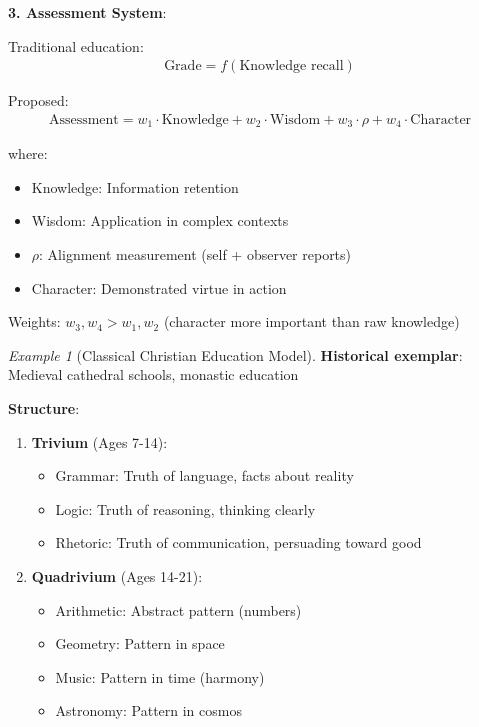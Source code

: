 \documentclass[11pt,a4paper]{article}
\theoremstyle{definition}
\theoremstyle{remark}
\newtheorem{example}{Example}[section]
\begin{document}
\begin{small}
\begin{enumerate}
\begin{protocol}
\begin{protocol}
\textbf{3. Assessment System}:

Traditional education:
\begin{align}
\text{Grade} = f(\text{Knowledge recall})
\end{align}

Proposed:
\begin{align}
\text{Assessment} = w_1 \cdot \text{Knowledge} + w_2 \cdot \text{Wisdom} + w_3 \cdot \rho + w_4 \cdot \text{Character}
\end{align}

where:
\begin{itemize}
    \item Knowledge: Information retention
    \item Wisdom: Application in complex contexts
    \item \(\rho\): Alignment measurement (self + observer reports)
    \item Character: Demonstrated virtue in action
\end{itemize}

Weights: \(w_3, w_4 > w_1, w_2\) (character more important than raw knowledge)
\end{protocol}

\begin{example}[Classical Christian Education Model]
\textbf{Historical exemplar}: Medieval cathedral schools, monastic education

\textbf{Structure}:
\begin{enumerate}
    \item \textbf{Trivium} (Ages 7-14):
        \begin{itemize}
            \item Grammar: Truth of language, facts about reality
            \item Logic: Truth of reasoning, thinking clearly
            \item Rhetoric: Truth of communication, persuading toward good
        \end{itemize}
    
    \item \textbf{Quadrivium} (Ages 14-21):
        \begin{itemize}
            \item Arithmetic: Abstract pattern (numbers)
            \item Geometry: Pattern in space
            \item Music: Pattern in time (harmony)
            \item Astronomy: Pattern in cosmos
        \end{itemize}
    

\end{enumerate}
\end{example}
\end{protocol}
\end{enumerate}
\end{small}
\end{document}
